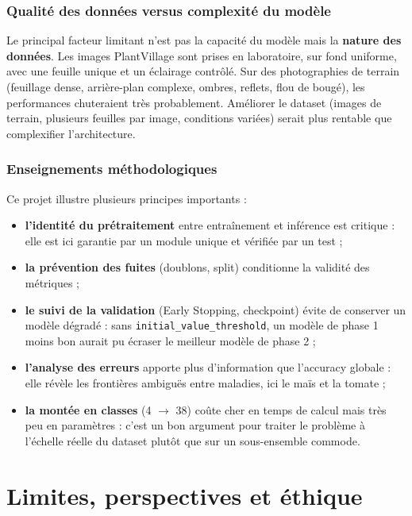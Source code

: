 \documentclass[10pt,a4paper]{article}
\begin{document}
\subsubsection{Qualité des données versus complexité du modèle}

Le principal facteur limitant n'est pas la capacité du modèle mais la \textbf{nature des données}. Les images PlantVillage sont prises en laboratoire, sur fond uniforme, avec une feuille unique et un éclairage contrôlé. Sur des photographies de terrain (feuillage dense, arrière-plan complexe, ombres, reflets, flou de bougé), les performances chuteraient très probablement. Améliorer le dataset (images de terrain, plusieurs feuilles par image, conditions variées) serait plus rentable que complexifier l'architecture.

\subsubsection{Enseignements méthodologiques}

Ce projet illustre plusieurs principes importants :

\begin{itemize}
\item \textbf{l'identité du prétraitement} entre entraînement et inférence est critique : elle est ici garantie par un module unique et vérifiée par un test ;
\item \textbf{la prévention des fuites} (doublons, split) conditionne la validité des métriques ;
\item \textbf{le suivi de la validation} (Early Stopping, checkpoint) évite de conserver un modèle dégradé : sans \texttt{initial\_\allowbreak{}value\_\allowbreak{}threshold}, un modèle de phase 1 moins bon aurait pu écraser le meilleur modèle de phase 2 ;
\item \textbf{l'analyse des erreurs} apporte plus d'information que l'accuracy globale : elle révèle les frontières ambiguës entre maladies, ici le maïs et la tomate ;
\item \textbf{la montée en classes} (4 $\rightarrow$ 38) coûte cher en temps de calcul mais très peu en paramètres : c'est un bon argument pour traiter le problème à l'échelle réelle du dataset plutôt que sur un sous-ensemble commode.
\end{itemize}

\clearpage

\section{Limites, perspectives et éthique}
\label{sec:7}%
\end{document}
